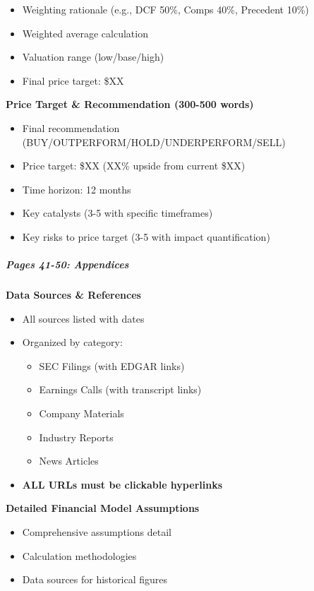 \documentclass[11pt]{article}
\begin{document}
\begin{itemize}[leftmargin=*,itemsep=2pt,topsep=2pt]
\item {} Weighting rationale (e.g., DCF 50\%, Comps 40\%, Precedent 10\%)
\item {} Weighted average calculation
\item {} Valuation range (low/base/high)
\item {} Final price target: \$XX
\end{itemize}

\textbf{Price Target \& Recommendation (300-500 words)}

\begin{itemize}[leftmargin=*,itemsep=2pt,topsep=2pt]
\item {} Final recommendation (BUY/OUTPERFORM/HOLD/UNDERPERFORM/SELL)
\item {} Price target: \$XX (XX\% upside from current \$XX)
\item {} Time horizon: 12 months
\item {} Key catalysts (3-5 with specific timeframes)
\item {} Key risks to price target (3-5 with impact quantification)
\end{itemize}

\subparagraph{Pages 41-50: Appendices}\mbox{}\par

\textbf{Data Sources \& References}

\begin{itemize}[leftmargin=*,itemsep=2pt,topsep=2pt]
\item {} All sources listed with dates
\item {} Organized by category:
\begin{itemize}[leftmargin=*,itemsep=2pt,topsep=2pt]
\item {} SEC Filings (with EDGAR links)
\item {} Earnings Calls (with transcript links)
\item {} Company Materials
\item {} Industry Reports
\item {} News Articles
\end{itemize}
\item {} \textbf{ALL URLs must be clickable hyperlinks}
\end{itemize}

\textbf{Detailed Financial Model Assumptions}

\begin{itemize}[leftmargin=*,itemsep=2pt,topsep=2pt]
\item {} Comprehensive assumptions detail
\item {} Calculation methodologies
\item {} Data sources for historical figures
\end{itemize}
\end{document}
